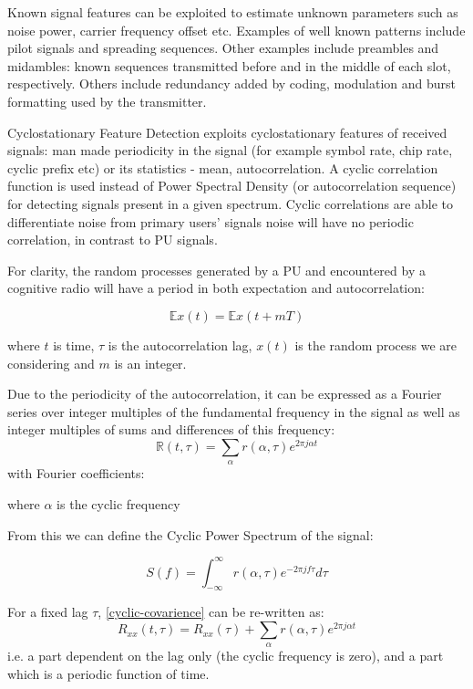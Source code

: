 Known signal features can be exploited to estimate unknown parameters such as noise power, carrier frequency offset etc. Examples of well known patterns include pilot signals and spreading sequences. Other examples include preambles and midambles: known sequences transmitted before and in the middle of each slot, respectively. Others include redundancy added by coding, modulation and burst formatting used by the transmitter. 

Cyclostationary Feature Detection exploits cyclostationary features of received signals: man made periodicity in the signal (for example symbol rate, chip rate, cyclic prefix etc) or its statistics - mean, autocorrelation. A cyclic correlation function is used instead of Power Spectral Density (or autocorrelation sequence) for detecting signals present in a given spectrum. Cyclic correlations are able to differentiate noise from primary users' signals  noise will have no periodic correlation, in contrast to PU signals.

For clarity, the random processes generated by a PU and encountered by a cognitive radio will have a period in both expectation and autocorrelation:

\begin{equation}
\mathbb{E}x\left(t\right) = \mathbb{E}x\left(t + mT\right) 
\end{equation}


where \(t\) is time, \(\tau\) is the autocorrelation lag, \(x\left(t\right)\) is the random process we are considering and \(m\) is an integer. 

Due to the periodicity of the autocorrelation, it can be expressed as a Fourier series over integer multiples of the fundamental frequency in the signal as well as integer multiples of sums and differences of this frequency:
%
\begin{equation}
\mathbb{R}\left(t, \tau\right) = \sum_{\alpha} r\left(\alpha, \tau\right) e^{2\pi j \alpha t}  
\end{equation}
\label{cyclic-covarience}
%
with Fourier coefficients:
%

%
where \(\alpha\) is the cyclic frequency

From this we can define the Cyclic Power Spectrum of the signal:

\begin{equation}
S\left(f\right) = \int_{-\infty}^{\infty} r\left(\alpha, \tau\right) e^{-2 \pi j f \tau} d\tau
\end{equation}

For a fixed lag \(\tau\), \ref{cyclic-covarience} can be re-written as:
%
\begin{equation}
R_{xx}\left(t, \tau \right) = R_{xx}\left(\tau\right) + \sum_{\alpha} r\left(\alpha, \tau\right) e^{2\pi j \alpha t}  
\end{equation}
%
i.e. a part dependent on the lag only (the cyclic frequency is zero), and a part which is a periodic function of time. 

